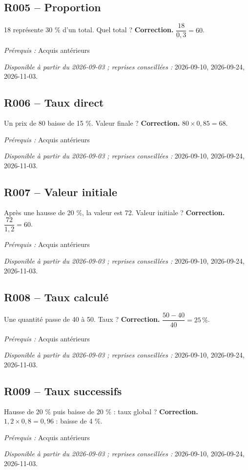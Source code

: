 \subsection*{R005 -- Proportion}\label{R005}
18 représente 30 \% d’un total. Quel total ?
\ifprof\textbf{Correction.} $\dfrac{18}{0{,}3}=60$.\par\textit{Prérequis :} Acquis antérieurs\par\textit{Disponible à partir du 2026-09-03 ; reprises conseillées :} 2026-09-10, 2026-09-24, 2026-11-03.\fi
{}\subsection*{R006 -- Taux direct}\label{R006}
Un prix de 80 baisse de 15 \%. Valeur finale ?
\ifprof\textbf{Correction.} $80\times0{,}85=68$.\par\textit{Prérequis :} Acquis antérieurs\par\textit{Disponible à partir du 2026-09-03 ; reprises conseillées :} 2026-09-10, 2026-09-24, 2026-11-03.\fi
{}\subsection*{R007 -- Valeur initiale}\label{R007}
Après une hausse de 20 \%, la valeur est 72. Valeur initiale ?
\ifprof\textbf{Correction.} $\dfrac{72}{1{,}2}=60$.\par\textit{Prérequis :} Acquis antérieurs\par\textit{Disponible à partir du 2026-09-03 ; reprises conseillées :} 2026-09-10, 2026-09-24, 2026-11-03.\fi
{}\subsection*{R008 -- Taux calculé}\label{R008}
Une quantité passe de 40 à 50. Taux ?
\ifprof\textbf{Correction.} $\dfrac{50-40}{40}=25\,\%$.\par\textit{Prérequis :} Acquis antérieurs\par\textit{Disponible à partir du 2026-09-03 ; reprises conseillées :} 2026-09-10, 2026-09-24, 2026-11-03.\fi
{}\subsection*{R009 -- Taux successifs}\label{R009}
Hausse de 20 \% puis baisse de 20 \% : taux global ?
\ifprof\textbf{Correction.} $1{,}2\times0{,}8=0{,}96$ : baisse de 4 \%.\par\textit{Prérequis :} Acquis antérieurs\par\textit{Disponible à partir du 2026-09-03 ; reprises conseillées :} 2026-09-10, 2026-09-24, 2026-11-03.\fi
